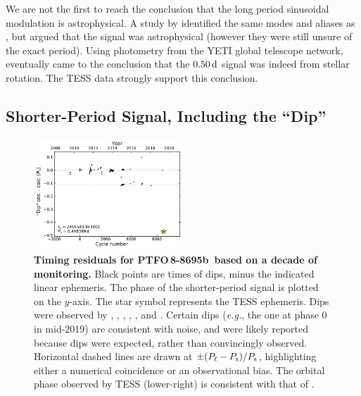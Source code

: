 \documentclass[12pt,twocolumn,tighten]{aastex62}
\newcommand{\ptfob}{PTFO$\,$8-8695b}
\begin{document}
We are not the first to reach the conclusion that the long period
sinusoidal modulation is astrophysical.  A study by
\citet{koen_multicolour_2015} identified the same modes and aliases as
\citet{van_eyken_ptf_2012}, but argued that the signal was
astrophysical (however they were still unsure of the exact period).
Using photometry from the YETI global telescope network,
\citet{raetz_yeti_2016} eventually came to the conclusion that the
$0.50\,{\rm d}$ signal was indeed from stellar rotation.  The TESS
data strongly support this conclusion.



\subsection{Shorter-Period Signal, Including the ``Dip''}

\begin{figure}[t]
	\begin{center}
		\leavevmode
		\includegraphics[width=0.5\textwidth]{f6.pdf}
	\end{center}
	\vspace{-0.7cm}
	\caption{
    {\bf Timing residuals for \ptfob\ based on a decade of
    monitoring.} Black points are times of dips, minus the indicated
    linear ephemeris.  The phase of the shorter-period signal is
    plotted on the $y$-axis. The star symbol represents the TESS
    ephemeris.  Dips were observed by \citet{van_eyken_ptf_2012},
    \citet{ciardi_followup_2015}, \citet{yu_tests_2015},
    \citet{raetz_yeti_2016}, \citet{onitsuka_multicolor_2017}, and
    \citet{tanimoto_evidence_2020}.  Certain dips ({\it e.g.}, the one
    at phase 0 in mid-2019) are consistent with noise, and were likely
    reported because dips were expected, rather than convincingly
    observed.  Horizontal dashed lines are drawn at $\pm (P_{\rm \ell}
    - P_{\rm s})/P_{\rm s}$, highlighting either a numerical
    coincidence or an observational bias.  The orbital phase observed
    by TESS (lower-right) is consistent with that of
    \citet{tanimoto_evidence_2020}.
		\label{fig:o_minus_c}
	}
\end{figure}
\end{document}
